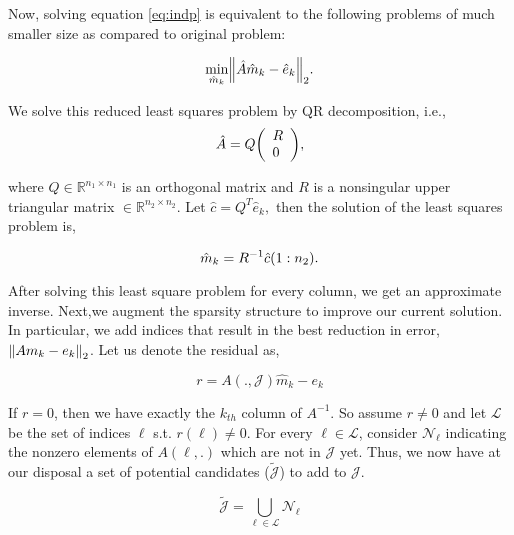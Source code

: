 \documentclass[paper=A4, fontsize=11pt]{scrartcl}
\let\originalleft\left
\let\originalright\right
\renewcommand{\left}{\mathopen{}\mathclose\bgroup\originalleft}
\renewcommand{\right}{\aftergroup\egroup\originalright}
\theoremstyle{remark}
\begin{document}
Now, solving equation \eqref{eq:indp} is equivalent to the following problems of much smaller size as compared to original problem:

\begin{equation}
\min _{\hat{m}_{k}}\left\|\hat{A} \hat{m}_{k}-\hat{e}_{k}\right\|_{2}.
\end{equation}

We solve this reduced least squares problem by QR decomposition, i.e., 
\begin{equation}
\hat{A}=Q\left(\begin{array}{l}{R} \\ {0}\end{array}\right),
\end{equation}

where $Q \in \mathbb{R}^{n_{1} \times n_{1}}$ is an orthogonal matrix and \(R\) is a nonsingular upper triangular matrix  $\in \mathbb{R}^{n_{2} \times n_{2}}$. Let \(\hat{c}=Q^{T} \hat{e}_{k},\) then the solution of the least squares problem is,

\begin{equation}
\hat{m}_{k}=R^{-1} \hat{c}\left(1 : n_{2}\right).
\end{equation}


After solving this least square problem for every column, we get an approximate inverse. Next,we augment the sparsity structure to improve our current solution. \\


In particular, we add indices that result in the best reduction in error,  \(\left\|A m_{k}-e_{k}\right\|_{2}\). Let us denote the residual as,

\begin{equation}
r=A( ., \mathcal{J}) \hat{m}_{k}-e_{k}
\end{equation}


If $r = 0$, then we have exactly the $k_{th}$ column of $A^{-1}$. So  assume $r \neq 0$ and let $\mathcal{L}$ be the set of indices $\ell$ s.t. $r(\ell) \neq 0$. For every $ \ell \in \mathcal{L} $, consider \(\mathcal{N}_{\ell}\) indicating the nonzero elements of $A(\ell,.)$ which are not in $\mathcal{J}$ yet. Thus, we now have at our disposal a set of potential candidates ($\tilde{\mathcal{J}}$) to add to $\mathcal{J}$.


\begin{equation}
\tilde{\mathcal{J}}=\bigcup_{\ell \in \mathcal{L}} \mathcal{N}_{\ell}
\end{equation}
\end{document}
